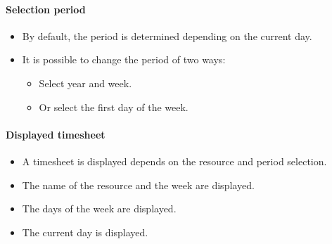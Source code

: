 \documentclass[letterpaper,10pt,english]{sphinxmanual}
\begin{document}
\paragraph{Selection period}
\begin{itemize}
\item {} 
By default, the period is determined depending on the current day.

\item {} 
It is possible to change the period of two ways:
\begin{itemize}
\item {} 
Select year and week. 

\item {} 
Or select the first day of the week. 

\end{itemize}

\end{itemize}
\paragraph{Displayed timesheet}
\begin{itemize}
\item {} 
A timesheet is displayed depends on the resource and period selection.

\item {} 
The name of the resource and the week are displayed. 

\item {} 
The days of the week are displayed. 

\item {} 
The current day is displayed. 

\end{itemize}
\newpage
\end{document}
